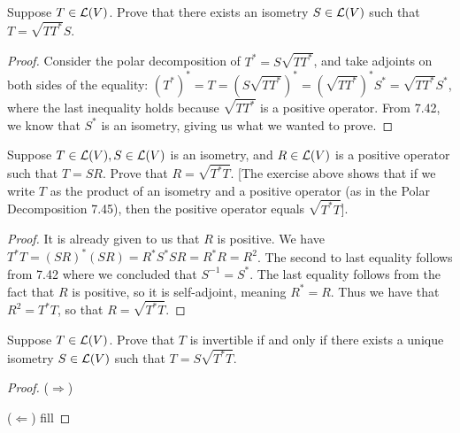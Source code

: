 \begin{exercise}{3}
  Suppose $T\in\mathcal{L}(V)$. Prove that there exists an isometry $S\in\mathcal{L}(V)$ such that $T =\sqrt{TT^\ast}S$.
\end{exercise}
\begin{proof}
 Consider the polar decomposition of $T^\ast=S\sqrt{TT^\ast}$, and take adjoints on both sides of the equality: $(T^\ast)^\ast = T =(S\sqrt{TT^\ast})^\ast =(\sqrt{TT^\ast})^\ast S^\ast =\sqrt{TT^\ast}S^\ast$, where the last inequality holds because $\sqrt{TT^\ast}$ is a positive operator. From 7.42, we know that $S^\ast$ is an isometry, giving us what we wanted to prove.
\end{proof}

\begin{exercise}{8}
  Suppose $T\in\mathcal{L}(V),S\in\mathcal{L}(V)$ is an isometry, and $R\in\mathcal{L}(V)$ is a positive operator such that $T=SR$. Prove that $R =\sqrt{T^\ast T}$. [The exercise above shows that if we write $T$ as the product of an isometry and a positive operator (as in the Polar Decomposition 7.45), then the positive operator equals $\sqrt{T^\ast T}$].
\end{exercise}
\begin{proof}
 It is already given to us that $R$ is positive. We have $T^\ast T =(SR)^\ast (SR) =R^\ast S^\ast S R =R^\ast R =R^2$. The second to last equality follows from 7.42 where we concluded that $S^{-1} =S^\ast$. The last equality follows from the fact that $R$ is positive, so it is self-adjoint, meaning $R^\ast = R$. Thus we have that $R^2 =T^\ast T$, so that $R =\sqrt{T^\ast T}$.
\end{proof}

\begin{exercise}{9}
  Suppose $T\in\mathcal{L}(V)$. Prove that $T$ is invertible if and only if there exists a unique isometry $S\in\mathcal{L}(V)$ such that $T =S\sqrt{T^\ast T}$.
\end{exercise}
\begin{proof}
 ($\Rightarrow$) %

 ($\Leftarrow$) fill%
\end{proof}

